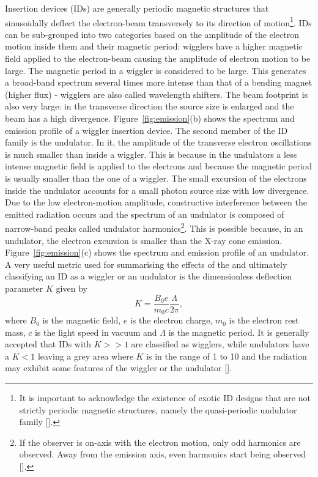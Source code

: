 \begin{refsection}
Insertion devices (IDs) are generally periodic magnetic structures that sinusoidally deflect the electron-beam transversely to its direction of motion\footnote{It is important to acknowledge the existence of exotic ID designs that are not strictly periodic magnetic structures, namely the quasi-periodic undulator family [\cite[\textit{§7.2}]{Elleaume2013}].}. IDs can be sub-grouped into two categories based on the amplitude of the electron motion inside them and their magnetic period: wigglers have a higher magnetic field applied to the electron-beam causing the amplitude of electron motion to be large. The magnetic period in a wiggler is considered to be large. This generates a broad-band spectrum several times more intense than that of a bending magnet (higher flux) - wigglers are also called wavelength shifters. The beam footprint is also very large: in the transverse direction the source size is enlarged and the beam has a high divergence. Figure~\ref{fig:emission}(b) shows the spectrum and emission profile of a wiggler insertion device. The second member of the ID family is the undulator. In it, the amplitude of the transverse electron oscillations is much smaller than inside a wiggler. This is because in the undulators a less intense magnetic field is applied to the electrons and because the magnetic period is usually smaller than the one of a wiggler. The small excursion of the electrons inside the undulator accounts for a small photon source size with low divergence. Due to the low electron-motion amplitude, constructive interference between the emitted radiation occurs and the spectrum of an undulator is composed of narrow-band peaks called undulator harmonics\footnote{If the observer is on-axis with the electron motion, only odd harmonics are observed. Away from the emission axis, even harmonics start being observed [\cite[\textit{§4.2}]{Clarke2004}].}. This is possible because, in an undulator, the electron excursion is smaller than the X-ray cone emission. Figure~\ref{fig:emission}(c) shows the spectrum and emission profile of an undulator. A very useful metric used for summarising the effects of the and ultimately classifying an ID as a wiggler or an undulator is the dimensionless deflection parameter $K$ given by
\begin{equation}
    K=\frac{B_0e}{m_0c}\frac{\Lambda}{2\pi},
\end{equation}
where $B_0$ is the magnetic field, $e$ is the electron charge, $m_0$ is the electron rest mass, $c$ is the light speed in vacuum and $\Lambda$ is the magnetic period. It is generally accepted that IDs with $K>>1$ are classified as wigglers, while undulators have a $K<1$ leaving a grey area where $K$ is in the range of 1 to 10 and the radiation may exhibit some features of the wiggler or the undulator [\cite[§3.1]{Clarke2004}].


\end{refsection}
